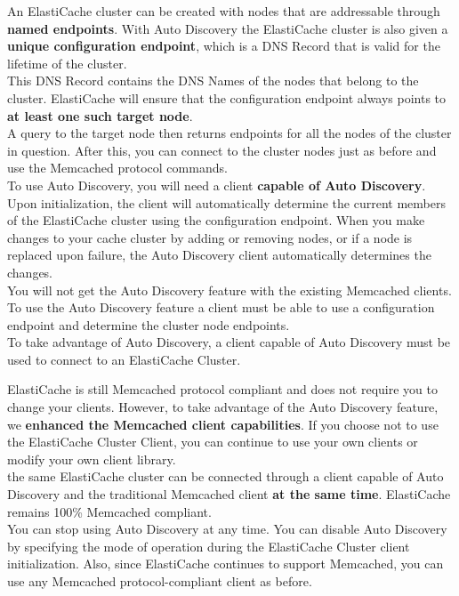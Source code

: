 \documentclass[12pt, letterpaper, twoside]{article}
\begin{document}
An ElastiCache cluster can be created with nodes that are addressable through \textbf{named endpoints}. With Auto Discovery the 
ElastiCache cluster is also given a \textbf{unique configuration endpoint}, which is a DNS Record that is valid for the lifetime 
of the cluster.\\
This DNS Record contains the DNS Names of the nodes that belong to the cluster. ElastiCache will ensure that the configuration 
endpoint always points to \textbf{at least one such target node}.\\
A query to the target node then returns endpoints for all the nodes of the cluster in question. After this, you can connect to 
the cluster nodes just as before and use the Memcached protocol commands.\\
To use Auto Discovery, you will need a client \textbf{capable of Auto Discovery}.
Upon initialization, the client will automatically determine the current members of the ElastiCache cluster using the configuration 
endpoint. When you make changes to your cache cluster by adding or removing nodes, or if a node is replaced upon failure, 
the Auto Discovery client automatically determines the changes.\\

You will not get the Auto Discovery feature with the existing Memcached clients. To use the Auto Discovery feature a client must 
be able to use a configuration endpoint and determine the cluster node endpoints.\\

To take advantage of Auto Discovery, a client capable of Auto Discovery must be used to connect to an ElastiCache Cluster.

ElastiCache is still Memcached protocol compliant and does not require you to change your clients. However, to take advantage of 
the Auto Discovery feature, we \textbf{enhanced the Memcached client capabilities}. If you choose not to use the ElastiCache Cluster 
Client, you can continue to use your own clients or modify your own client library.\\

the same ElastiCache cluster can be connected through a client capable of Auto Discovery and the traditional Memcached client 
\textbf{at the same time}. ElastiCache remains 100\% Memcached compliant.\\

You can stop using Auto Discovery at any time. You can disable Auto Discovery by specifying the mode of operation during the 
ElastiCache Cluster client initialization. Also, since ElastiCache continues to support Memcached, you can use any Memcached 
protocol-compliant client as before.\\
\end{document}
